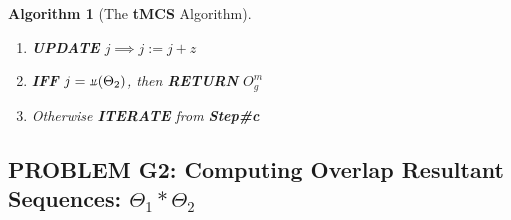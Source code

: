 \documentclass[a4paper, 18pt]{book} %
\newtheorem{alg}{Algorithm}
\newcommand{\invpi}{\rotatebox[origin=c]{180}{$\pi$}}
\begin{document}
\begin{alg}[The \textbf{tMCS} Algorithm]
\begin{enumerate}
{\begin{enumerate}
{ for some $k \in [1,\invpi(\Theta_1)]$ and $l \in [1,\invpi(\Theta_2)]$.
 
 \textbf{CREATE}  another array of maximum length $m$, $O^m$, which contains at most m elements generated thus:
 \begin{itemize}
 \item $O^m[i]$ contains 0 if the corresponding two elements in $\Theta_1$ and $\Theta_2$ didn't match. Otherwise it contains the matching element value from the first sequence --- or rather, $f(a_{1,k},a_{2,l}) = a_{1,k}$ iff $a_{1,k} == a_{2,l}$.
 \item \textbf{TRUNCATE}  $O^m$ to its longest non-zero/non-empty subsequence, set that as $O^m$.
 \item \textbf{IFF}  $\invpi(O^m) > \invpi(O^m_g)$, then \textbf{UPDATE} or replace $O^m_g$ with $O^m$\\ $\implies$  $O^m_g := O^m$
 \end{itemize}
}
\item{
\textbf{UPDATE}  $j \implies j := j + z$
}
\item {
\textbf{IFF}  $j = \invpi(\Theta_2)$, then \textbf{RETURN}  $O^m_g$
}
\item{Otherwise \textbf{ITERATE}  from \textbf{Step\#c}}
\end{enumerate}
}
\end{enumerate}
\end{alg}


\subsection{PROBLEM G2: Computing Overlap Resultant Sequences: $\Theta_1 \ast \Theta_2$}
\label{PROBG2}
\end{document}
